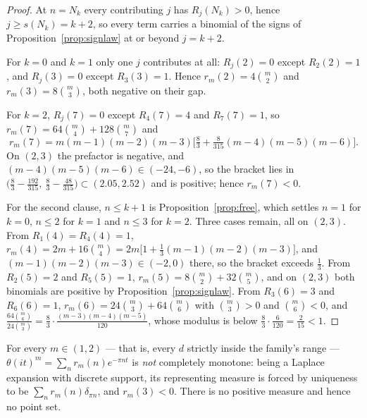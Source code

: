 \begin{proof}
At $n=N_k$ every contributing $j$ has $R_j(N_k)>0$, hence $j\ge s(N_k)=k+2$, so
every term carries a binomial of the signs of
Proposition~\ref{prop:signlaw} at or beyond $j=k+2$.

For $k=0$ and $k=1$ only one $j$ contributes at all: $R_j(2)=0$ except
$R_2(2)=1$, and $R_j(3)=0$ except $R_3(3)=1$. Hence $r_m(2)=4\binom m2$ and
$r_m(3)=8\binom m3$, both negative on their gap.

For $k=2$, $R_j(7)=0$ except $R_4(7)=4$ and $R_7(7)=1$, so
$r_m(7)=64\binom m4+128\binom m7$ and
\[
 r_m(7)=m(m-1)(m-2)(m-3)\Big[\tfrac83+\tfrac8{315}(m-4)(m-5)(m-6)\Big].
\]
On $(2,3)$ the prefactor is negative, and $(m-4)(m-5)(m-6)\in(-24,-6)$, so the
bracket lies in $\big(\frac83-\frac{192}{315},\ \frac83-\frac{48}{315}\big)
\subset(2.05,2.52)$ and is positive; hence $r_m(7)<0$.

For the second clause, $n\le k+1$ is Proposition~\ref{prop:free}, which settles
$n=1$ for $k=0$, $n\le2$ for $k=1$ and $n\le3$ for $k=2$. Three cases remain, all
on $(2,3)$. From $R_1(4)=R_4(4)=1$,
$r_m(4)=2m+16\binom m4=2m\big[1+\frac13(m-1)(m-2)(m-3)\big]$, and
$(m-1)(m-2)(m-3)\in(-2,0)$ there, so the bracket exceeds $\frac13$. From
$R_2(5)=2$ and $R_5(5)=1$, $r_m(5)=8\binom m2+32\binom m5$, and on $(2,3)$ both
binomials are positive by Proposition~\ref{prop:signlaw}. From $R_3(6)=3$ and
$R_6(6)=1$, $r_m(6)=24\binom m3+64\binom m6$ with $\binom m3>0$ and
$\binom m6<0$, and
$\frac{64\binom m6}{24\binom m3}=\frac83\cdot\frac{(m-3)(m-4)(m-5)}{120}$, whose
modulus is below $\frac83\cdot\frac6{120}=\frac2{15}<1$.
\end{proof}

\begin{corollary}\label{cor:nolattice}
For every $m\in(1,2)$ --- that is, every $d$ strictly inside the family's range
--- $\theta(it)^{m}=\sum_nr_m(n)e^{-\pi nt}$ is \emph{not} completely monotone:
being a Laplace expansion with discrete support, its representing measure is
forced by uniqueness to be $\sum_nr_m(n)\delta_{\pi n}$, and $r_m(3)<0$. There is
no positive measure and hence no point set.
\end{corollary}

